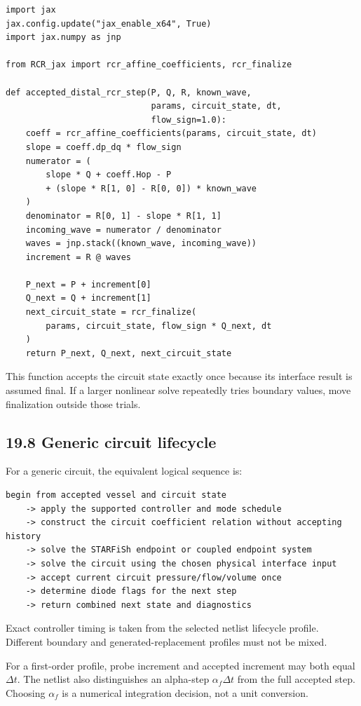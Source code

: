 \documentclass[11pt,a4paper]{article}
\begin{document}
\begin{lstlisting}
import jax
jax.config.update("jax_enable_x64", True)
import jax.numpy as jnp

from RCR_jax import rcr_affine_coefficients, rcr_finalize

def accepted_distal_rcr_step(P, Q, R, known_wave,
                             params, circuit_state, dt,
                             flow_sign=1.0):
    coeff = rcr_affine_coefficients(params, circuit_state, dt)
    slope = coeff.dp_dq * flow_sign
    numerator = (
        slope * Q + coeff.Hop - P
        + (slope * R[1, 0] - R[0, 0]) * known_wave
    )
    denominator = R[0, 1] - slope * R[1, 1]
    incoming_wave = numerator / denominator
    waves = jnp.stack((known_wave, incoming_wave))
    increment = R @ waves

    P_next = P + increment[0]
    Q_next = Q + increment[1]
    next_circuit_state = rcr_finalize(
        params, circuit_state, flow_sign * Q_next, dt
    )
    return P_next, Q_next, next_circuit_state
\end{lstlisting}
This function accepts the circuit state exactly once because its interface result is assumed final. If a larger nonlinear solve repeatedly tries boundary values, move finalization outside those trials.

\subsection{19.8 Generic circuit lifecycle}
For a generic circuit, the equivalent logical sequence is:


\begin{lstlisting}
begin from accepted vessel and circuit state
    -> apply the supported controller and mode schedule
    -> construct the circuit coefficient relation without accepting history
    -> solve the STARFiSh endpoint or coupled endpoint system
    -> solve the circuit using the chosen physical interface input
    -> accept current circuit pressure/flow/volume once
    -> determine diode flags for the next step
    -> return combined next state and diagnostics
\end{lstlisting}
Exact controller timing is taken from the selected netlist lifecycle profile. Different boundary and generated-replacement profiles must not be mixed.

For a first-order profile, probe increment and accepted increment may both equal \(\Delta t\). The netlist also distinguishes an alpha-step \(\alpha_f\Delta t\) from the full accepted step. Choosing \(\alpha_f\) is a numerical integration decision, not a unit conversion.
\end{document}
